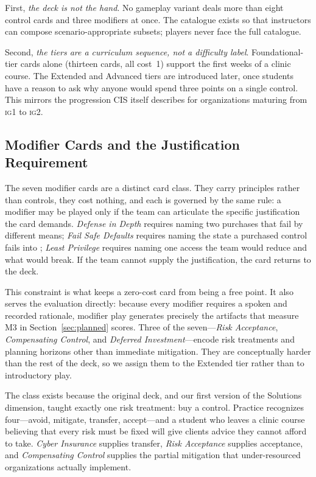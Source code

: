 \documentclass[10pt,twocolumn,letterpaper]{article}
\newcommand{\ig}[1]{\textsc{ig#1}}
\begin{document}
First, \emph{the deck is not the hand}. No gameplay variant deals more than
eight control cards and three modifiers at once. The catalogue exists so that instructors can
compose scenario-appropriate subsets; players never face the full catalogue.

Second, \emph{the tiers are a curriculum sequence, not a difficulty label}.
Foundational-tier cards alone (thirteen cards, all cost~1) support the first
weeks of a clinic course. The Extended and Advanced tiers are introduced later,
once students have a reason to ask why anyone would spend three points on a
single control. This mirrors the progression CIS itself describes for
organizations maturing from \ig{1} to \ig{2}.

\subsection{Modifier Cards and the Justification Requirement}
\label{sec:modifiers}

The seven modifier cards are a distinct card class. They carry principles rather
than controls, they cost nothing, and each is governed by the same rule: a
modifier may be played only if the team can articulate the specific
justification the card demands. \emph{Defense in Depth} requires naming two
purchases that fail by different means; \emph{Fail Safe Defaults} requires
naming the state a purchased control fails into \cite{saltzer1975protection};
\emph{Least Privilege}
requires naming one access the team would reduce and what would break. If the
team cannot supply the justification, the card returns to the deck.

This constraint is what keeps a zero-cost card from being a free point. It also
serves the evaluation directly: because every modifier requires a spoken and
recorded rationale, modifier play generates precisely the artifacts that measure
M3 in Section~\ref{sec:planned} scores. Three of the seven---\emph{Risk Acceptance}, \emph{Compensating Control}, and
\emph{Deferred Investment}---encode risk treatments and planning horizons other
than immediate mitigation. They are conceptually harder than the rest of the
deck, so we assign them to the Extended tier rather than to introductory play.

The class exists because the original deck, and our first version of the
Solutions dimension, taught exactly one risk treatment: buy a control. Practice
recognizes four---avoid, mitigate, transfer, accept---and a student who leaves a
clinic course believing that every risk must be fixed will give clients advice
they cannot afford to take. \emph{Cyber Insurance} supplies transfer,
\emph{Risk Acceptance} supplies acceptance, and \emph{Compensating Control}
supplies the partial mitigation that under-resourced organizations actually
implement.
\end{document}
